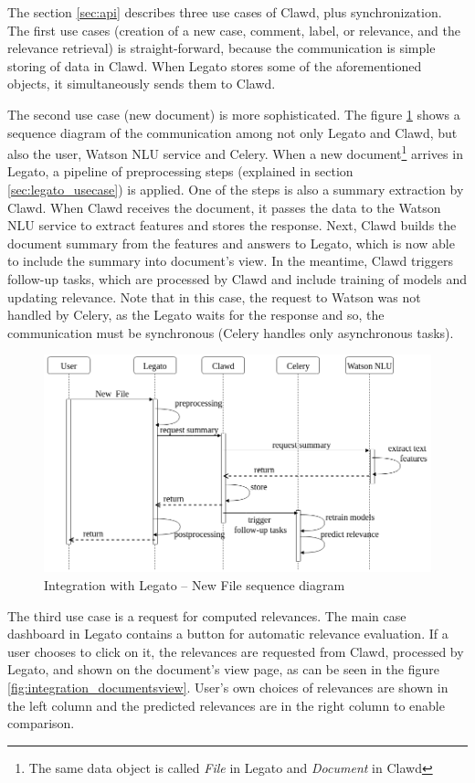\documentclass[
  digital, %
  notable,   %
  nolof,     %
  nolot,     %
]{fithesis3}
\begin{document}
The section \ref{sec:api} describes three use cases of Clawd, plus synchronization.
The first use cases (creation of a new case, comment, label, or relevance, and the relevance retrieval) is straight-forward, because the communication is simple storing of data in Clawd.
When Legato stores some of the aforementioned objects, it simultaneously sends them to Clawd.

The second use case (new document) is more sophisticated.
The figure \ref{fig:integration_new_file} shows a sequence diagram of the communication among not only Legato and Clawd, but also the user, Watson NLU service and Celery.
When a new document\footnote{The same data object is called \textit{File} in Legato and \textit{Document} in Clawd} arrives in Legato, a pipeline of preprocessing steps (explained in section \ref{sec:legato_usecase}) is applied.
One of the steps is also a summary extraction by Clawd.
When Clawd receives the document, it passes the data to the Watson NLU service to extract features and stores the response.
Next, Clawd builds the document summary from the features and answers to Legato, which is now able to include the summary into document's view.
In the meantime, Clawd triggers follow-up tasks, which are processed by Clawd and include training of models and updating relevance.
Note that in this case, the request to Watson was not handled by Celery, as the Legato waits for the response and so, the communication must be synchronous (Celery handles only asynchronous tasks).

\begin{figure}[h]
\caption{Integration with Legato -- New File sequence diagram}
\label{fig:integration_new_file}
\includegraphics[width=\textwidth]{img/integration_new_file}
\end{figure}

The third use case is a request for computed relevances.
The main case dashboard in Legato contains a button for automatic relevance evaluation.
If a user chooses to click on it, the relevances are requested from Clawd, processed by Legato, and shown on the document's view page, as can be seen in the figure \ref{fig:integration_documentsview}.
User's own choices of relevances are shown in the left column and the predicted relevances are in the right column to enable comparison.
\end{document}
